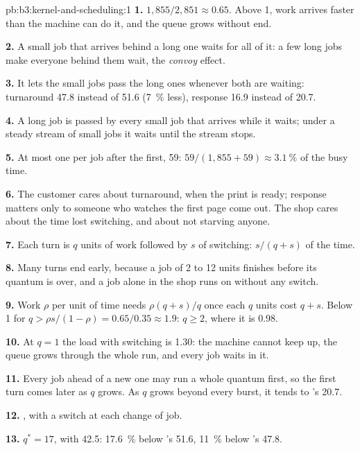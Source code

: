 \begin{solution}{pb:b3:kernel-and-scheduling:1}
\textbf{1.} $1{,}855/2{,}851 \approx 0.65$. Above 1, work arrives faster than the machine can do it, and the queue grows without end.

\textbf{2.} A small job that arrives behind a long one waits for all of it: a few long jobs make everyone behind them wait, the \emph{convoy} effect.

\textbf{3.} It lets the small jobs pass the long ones whenever both are waiting: turnaround 47.8 instead of 51.6 (7~\% less), response 16.9 instead of 20.7.

\textbf{4.} A long job is passed by every small job that arrives while it waits; under a steady stream of small jobs it waits until the stream stops.

\textbf{5.} At most one per job after the first, 59: $59/(1{,}855 + 59) \approx 3.1~\%$ of the busy time.

\textbf{6.} The customer cares about turnaround, when the print is ready; response matters only to someone who watches the first page come out. The shop cares about the time lost switching, and about not starving anyone.

\textbf{7.} Each turn is $q$ units of work followed by $s$ of switching: $s/(q + s)$ of the time.

\textbf{8.} Many turns end early, because a job of 2 to 12 units finishes before its quantum is over, and a job alone in the shop runs on without any switch.

\textbf{9.} Work $\rho$ per unit of time needs $\rho(q + s)/q$ once each $q$ units cost $q + s$. Below 1 for $q > \rho s/(1 - \rho) = 0.65/0.35 \approx 1.9$: $q \ge 2$, where it is 0.98.

\textbf{10.} At $q = 1$ the load with switching is 1.30: the machine cannot keep up, the queue grows through the whole run, and every job waits in it.

\textbf{11.} Every job ahead of a new one may run a whole quantum first, so the first turn comes later as $q$ grows. As $q$ grows beyond every burst, it tends to 's 20.7.

\textbf{12.} , with a switch at each change of job.

\textbf{13.} $q^* = 17$, with 42.5: 17.6~\% below 's 51.6, 11~\% below 's 47.8.


\end{solution}
